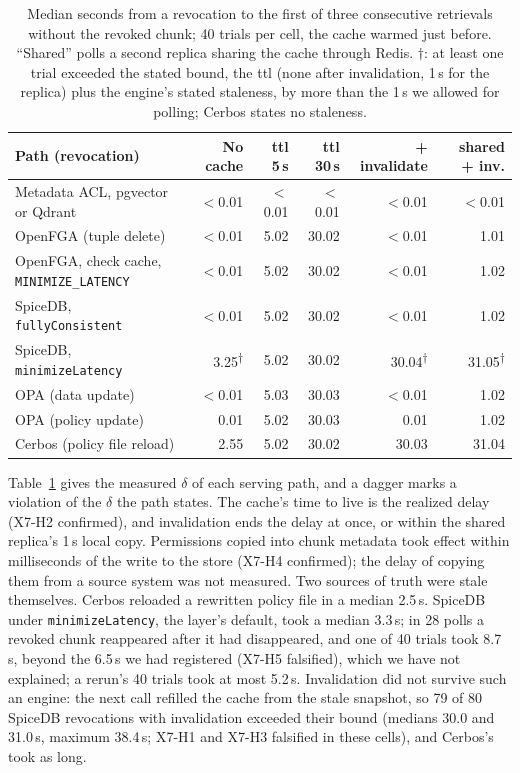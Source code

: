 \begin{table}[tbp]
\centering
\small
\setlength{\tabcolsep}{4pt}
\begin{tabular}{@{}lrrrrr@{}}
\toprule
Path (revocation) & No cache & ttl 5\,s & ttl 30\,s & + invalidate & shared + inv. \\
\midrule
Metadata ACL, pgvector or Qdrant & $<$0.01 & $<$0.01 & $<$0.01 & $<$0.01 & $<$0.01 \\
OpenFGA (tuple delete) & $<$0.01 & 5.02 & 30.02 & $<$0.01 & 1.01 \\
OpenFGA, check cache, \texttt{MINIMIZE\_LATENCY} & $<$0.01 & 5.02 & 30.02 & $<$0.01 & 1.02 \\
SpiceDB, \texttt{fullyConsistent} & $<$0.01 & 5.02 & 30.02 & $<$0.01 & 1.02 \\
SpiceDB, \texttt{minimizeLatency} & 3.25\textsuperscript{$\dagger$} & 5.02 & 30.02 & 30.04\textsuperscript{$\dagger$} & 31.05\textsuperscript{$\dagger$} \\
OPA (data update) & $<$0.01 & 5.03 & 30.03 & $<$0.01 & 1.02 \\
OPA (policy update) & 0.01 & 5.02 & 30.03 & 0.01 & 1.02 \\
Cerbos (policy file reload) & 2.55 & 5.02 & 30.02 & 30.03 & 31.04 \\
\bottomrule
\end{tabular}
\caption{Median seconds from a revocation to the first of three consecutive retrievals without the
revoked chunk; 40 trials per cell, the cache warmed just before. ``Shared'' polls a second replica
sharing the cache through Redis. $\dagger$: at least one trial exceeded the stated bound, the ttl
(none after invalidation, 1\,s for the replica) plus the engine's stated staleness, by more than the
1\,s we allowed for polling; Cerbos states no staleness.}
\label{tab:eng-revoke}
\end{table}

Table~\ref{tab:eng-revoke} gives the measured $\delta$ of each serving path, and a dagger marks a violation
of the $\delta$ the path states. The cache's time to live is the realized delay (X7-H2 confirmed), and invalidation ends the delay at once, or within the
shared replica's 1\,s local copy. Permissions copied into chunk metadata took effect within milliseconds of the write to the store
(X7-H4 confirmed); the delay of copying them from a source system was not measured. Two sources of truth were stale themselves. Cerbos reloaded a rewritten policy file in a
median 2.5\,s. SpiceDB under \texttt{minimizeLatency}, the layer's default, took a median
3.3\,s; in 28 polls a revoked chunk reappeared after it had disappeared, and one of 40 trials took 8.7\,s,
beyond the 6.5\,s we had registered (X7-H5 falsified), which we have not explained; a rerun's 40 trials took at most 5.2\,s.
Invalidation did not survive such an engine: the next call refilled the cache from the stale snapshot, so 79 of 80 SpiceDB revocations
with invalidation exceeded their bound (medians 30.0 and 31.0\,s, maximum 38.4\,s; X7-H1 and X7-H3 falsified in these cells), and
Cerbos's took as long.

